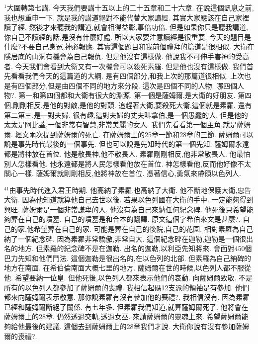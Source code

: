 \documentclass{book}
\begin{document}
$^{1}$大圍轉第七講.
今天我們要講十五以上的二十五章和二十六章.
在說這個訊息之前,我也想重申一下.
就是我的講道絕對不能代替大家讀經.
其實大家應該在自己家裡讀了經.
然後才來聽我的講道,就會相得益彰,事倍功倍.
但是如果你只是聽我講道,你自己不讀經的話,是沒有什麼好處.
所以大家要注意讀經是很重要.
今天的題目是什麼?不要自己身冤,神必報應.
其實這個題目和我前個禮拜的篇道是很相似.
大衛在隱居底的山洞有機會為自己報仇.
但是他沒有這樣做.
他說我不可伸手害神的受高者.
今天我們會看到大衛又有一次機會可以殺死素羅.
但是他也沒有這樣做.
我們首先看看我們今天的這篇道的大綱.
是有四個部分,和我上次的那篇道很相似.
上次也是有四個部分,但是由四個不同的地方來分段.
這次是四個不同的人物.
哪四個人物?.
第一和第四個都和大衛有很大的淵源.
第一個是薩姆爾,是大衛的好朋友.
第四個,剛剛相反,是他的對敵,是他的對頭.
追趕著大衛,要殺死大衛,這個就是素羅.
還有第二第三,是一對夫婦.
很有趣,這對夫婦的丈夫叫拿伯,是一個愚蠢的人.
但是他的太太是阿比蓋,一個非常有智慧,非常美麗的女人.
我們先看看第一個主角,就是薩姆爾.
經文兩次提到薩姆爾的死亡.
在薩姆爾上的25章一節和28章的三節.
薩姆爾可以說是事先時代最後的一個事先.
但也可以說是先知時代的第一個先知.
薩姆爾永遠都是將神放在首位.
他是敬畏神,他不敬畏人.
素羅剛剛相反,他非常敬畏人.
他最怕別人怎樣看他.
他永遠都是將人民怎樣看他放在首位.
神怎樣看他,反而他好像不太關心一樣.
薩姆爾就剛剛相反,他將神放在首位.
憑著信心,勇氣來帶領以色列人.

$^{41}$由事先時代進入君王時期.
他高納了素羅,也高納了大衛.
他不斷地保護大衛,忠告大衛.
因為他知道就算他自己去世以後.
若果以色列國在大衛的手中.
一定能夠得到興旺.
薩姆爾是一個非常謙卑的人.
他沒有為自己來納任何紀念碑.
他死後只希望能夠葬在自己的墳墓.
自己的墳墓是和合本的翻譯.
原文這個字希伯來文是甚麼?.
自己的家,他希望葬在自己的家.
可能是葬在自己的後院,自己的花園.
相對素羅為自己納了一個紀念碑.
因為素羅非常驕傲,非常自大.
這個紀念碑在迦勒,迦勒是一個很出名的地方.
但素羅的紀念碑不是在迦勒.
出名的迦勒,以利亞先知將來.
會面對450個巴力先知和他們鬥法.
這個迦勒是很出名的,在以色列的北部.
但素羅為自己納碑的地方在南面.
在希伯倫南面大概七里的地方.
薩姆爾在世的時候,以色列人都不服從他.
希望要納一位皇.
但他死後,以色列人都來表示他們的哀動.
向薩姆爾致敬.
不是所有的以色列人都參加了薩姆爾的喪禮.
我相信起碼12支派的領袖是有參加.
他們都來向薩姆爾表示敬意.
那你說素羅有沒有參加他的喪禮?.
我相信沒有.
因為素羅已經和薩姆爾斷絕了關係.
有七年多.
但素羅我們知道,就算薩姆爾死了.
他將會在薩姆爾上的28章.
仍然透過交軌,透過女巫.
來請薩姆爾的靈魂上來.
希望薩姆爾能夠給他最後的建議.
這個去到薩姆爾上的28章我們才說.
大衛你說有沒有參加薩姆爾的喪禮?.
\end{document}
